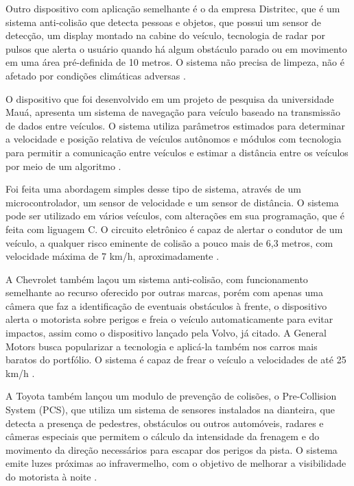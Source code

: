 Outro dispositivo com aplicação semelhante é o da empresa Distritec, que é um sistema anti-colisão que detecta pessoas e objetos, que possui
um sensor de detecção, um display montado na cabine do veículo, tecnologia de radar por pulsos que alerta o usuário quando há algum obstáculo
 parado ou em movimento em uma área pré-definida de 10 metros. O sistema não precisa de limpeza, não é afetado por condições climáticas adversas
  \cite{distritec}.

O dispositivo que foi desenvolvido em um projeto de pesquisa da universidade Mauá, apresenta um sistema de navegação para veículo baseado na
transmissão de dados entre veículos. O sistema utiliza parâmetros estimados para determinar a velocidade e posição relativa de veículos autônomos
e módulos com tecnologia para permitir a comunicação entre veículos e estimar a distância entre os veículos por meio de um algoritmo \cite{sensoriamento}.

Foi feita uma abordagem simples desse tipo de sistema, através de um microcontrolador, um sensor de velocidade e um sensor de distância. O sistema
 pode ser utilizado em vários veículos, com alterações em sua programação, que é feita com liguagem C. O circuito eletrônico é capaz de alertar o
 condutor de um veículo, a qualquer risco eminente de colisão a pouco mais de 6,3 metros, com velocidade máxima de 7 km/h, aproximadamente \cite{iesam}.

A Chevrolet também laçou um sistema anti-colisão, com funcionamento semelhante ao recurso oferecido por outras marcas, porém com apenas uma câmera
 que faz a identificação de eventuais obstáculos à frente, o dispositivo alerta o motorista sobre perigos e freia o veículo automaticamente para
 evitar impactos, assim como o dispositivo lançado pela Volvo, já citado. A General Motors busca popularizar a tecnologia e aplicá-la também nos
 carros mais baratos do portfólio. O sistema é capaz de frear o veículo a velocidades de até 25 km/h \cite{chevrolet}.

 A Toyota também lançou um modulo de prevenção de colisões, o Pre-Collision System (PCS), que utiliza um sistema de sensores instalados na
 dianteira, que detecta a presença de pedestres, obstáculos ou outros automóveis, radares e câmeras especiais que permitem o cálculo da intensidade
  da frenagem e do movimento da direção necessários para escapar dos perigos da pista. O sistema emite luzes próximas ao infravermelho, com o
  objetivo de melhorar a visibilidade do motorista à noite \cite{toyota}.

